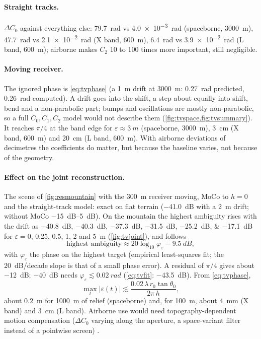 \paragraph{Straight tracks.} $\Delta C_0$ against everything else: \SI{79.7}{rad} vs \SI{4.0e-3}{rad} (spaceborne, \SI{3000}{m}),
\SI{47.7}{rad} vs \SI{2.1e-2}{rad} (X band, \SI{600}{m}), \SI{6.4}{rad} vs \SI{3.9e-2}{rad} (L band, \SI{600}{m}); airborne makes
$C_2$ 10 to 100 times more important, still negligible.

\paragraph{Moving receiver.} The ignored phase is \eqref{eq:tvphase} (a \SI{1}{m} drift at \SI{3000}{m}: \SI{0.27}{rad}
predicted, \SI{0.26}{rad} computed). A drift goes into the shift, a step about equally into shift, bend and a non-parabolic part;
bumps and oscillations are mostly non-parabolic, so a full $C_0,C_1,C_2$ model would not describe them
(\cref{fig:tvspace,fig:tvsummary}). It reaches $\pi/4$ at the band edge for
$\varepsilon\approx\SI{3}{m}$ (spaceborne, \SI{3000}{m}), \SI{3}{cm} (X band, \SI{600}{m}) and \SI{20}{cm} (L band, \SI{600}{m}).
With airborne deviations of decimetres the coefficients do matter, but because the baseline varies, not because of the
geometry.

\paragraph{Effect on the joint reconstruction.} The scene of \cref{fig:resmountain} with the \SI{300}{m} receiver moving, MoCo to
$h=0$ and the straight-track model: exact on flat terrain (\SI{-41.0}{dB} with a \SI{2}{m} drift; without MoCo
\SIrange{-15}{5}{dB}). On the mountain the highest ambiguity rises with the drift as
\SIlist{-40.8;-40.3;-37.3;-31.5;-25.2;-17.1}{dB} for $\varepsilon=0$, 0.25, 0.5, 1, 2 and \SI{5}{m} (\cref{fig:tvjoint}), and follows
\begin{equation}
  \text{highest ambiguity}\approx 20\log_{10}\varphi_\varepsilon - \SI{9.5}{dB},
  \label{eq:tvfit}
\end{equation}
with $\varphi_\varepsilon$ the phase on the highest target (empirical least-squares fit; the \SI{20}{dB}/decade slope is that of
a small phase error). A residual of $\pi/4$ gives about \SI{-12}{dB}; \SI{-40}{dB} needs $\varphi_\varepsilon\lesssim\SI{0.02}{rad}$
(\eqref{eq:tvfit}: \SI{-43.5}{dB}). From \eqref{eq:tvphase},
\begin{equation}
  \max_t|\varepsilon(t)|\lesssim\frac{0.02\,\lambda\,r_0\tan\theta_0}{2\pi\,h},
\end{equation}
about \SI{0.2}{m} for \SI{1000}{m} of relief (spaceborne) and, for \SI{100}{m}, about \SI{4}{mm} (X band) and \SI{3}{cm} (L band).
Airborne use would need topography-dependent motion compensation ($\Delta C_0$ varying along the aperture, a space-variant filter
instead of a pointwise screen) \cite{Prats2005topo,Prats2007moco}.

